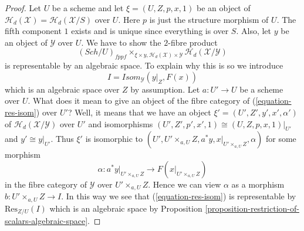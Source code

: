 \documentclass{stacks-project}
\theoremstyle{plain}
\theoremstyle{definition}
\theoremstyle{remark}
\numberwithin{equation}{subsection}
\def\Sch{\mathit{Sch}}
\begin{document}
\begin{proof}
Let $U$ be a scheme and let $\xi = (U, Z, p, x, 1)$ be an object of
$\mathcal{H}_d(\mathcal{X}) = \mathcal{H}_d(\mathcal{X}/S)$ over $U$.
Here $p$ is just the structure morphism of $U$.
The fifth component $1$ exists and is unique
since everything is over $S$.
Also, let $y$ be an object of $\mathcal{Y}$ over $U$.
We have to show the $2$-fibre product
\begin{equation}
\label{equation-res-isom}
(\Sch/U)_{fppf}
\times_{\xi \times y, \mathcal{H}_d(\mathcal{X}) \times \mathcal{Y}}
\mathcal{H}_d(\mathcal{X}/\mathcal{Y})
\end{equation}
is representable by an algebraic space. To explain why this is so
we introduce
$$
I = \mathit{Isom}_\mathcal{Y}(y|_Z, F(x))
$$
which is an algebraic space over $Z$ by assumption. Let $a : U' \to U$
be a scheme over $U$. What does it mean to give an object of the fibre
category of (\ref{equation-res-isom}) over $U'$? Well, it means that we
have an object $\xi' = (U', Z', y', x', \alpha')$ of
$\mathcal{H}_d(\mathcal{X}/\mathcal{Y})$ over $U'$ and isomorphisms
$(U', Z', p', x', 1) \cong (U, Z, p, x, 1)|_{U'}$ and
$y' \cong y|_{U'}$. Thus $\xi'$ is isomorphic to
$(U', U' \times_{a, U} Z, a^*y, x|_{U' \times_{a, U} Z}, \alpha)$
for some morphism
$$
\alpha :
a^*y|_{U' \times_{a, U} Z}
\longrightarrow
F(x|_{U' \times_{a, U} Z})
$$
in the fibre category of $\mathcal{Y}$ over $U' \times_{a, U} Z$. Hence
we can view $\alpha$ as a morphism $b : U' \times_{a, U} Z \to I$.
In this way we see that (\ref{equation-res-isom})
is representable by $\text{Res}_{Z/U}(I)$ which is an algebraic space by
Proposition \ref{proposition-restriction-of-scalars-algebraic-space}.
\end{proof}
\end{document}
